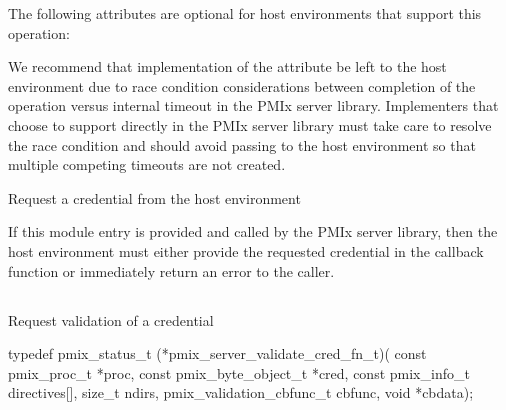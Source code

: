 
\reqattrend

\optattrstart
The following attributes are optional for host environments that support this operation:


\optattrend

\adviceimplstart
We recommend that implementation of the  attribute be left to the host environment due to race condition considerations between completion of the operation versus internal timeout in the \ac{PMIx} server library. Implementers that choose to support  directly in the \ac{PMIx} server library must take care to resolve the race condition and should avoid passing  to the host environment so that multiple competing timeouts are not created.
\adviceimplend


\descr

Request a credential from the host environment

\advicermstart
If this module entry is provided and called by the \ac{PMIx} server library, then the host environment must either provide the requested credential in the callback function or immediately return an error to the caller.
\advicermend

\subsection{}

\summary

Request validation of a credential

\format

\cspecificstart
\begin{codepar}
typedef pmix_status_t (*pmix_server_validate_cred_fn_t)(
                             const pmix_proc_t *proc,
                             const pmix_byte_object_t *cred,
                             const pmix_info_t directives[],
                             size_t ndirs,
                             pmix_validation_cbfunc_t cbfunc,
                             void *cbdata);
\end{codepar}
\cspecificend

\begin{arglist}
\end{arglist}

